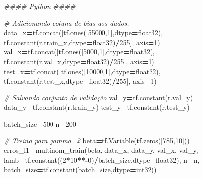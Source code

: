 \documentclass[
]{article}
\newenvironment{Shaded}{\begin{snugshade}}{\end{snugshade}}
\newcommand{\CommentTok}[1]{\textcolor[rgb]{0.56,0.35,0.01}{\textit{#1}}}
\newcommand{\DecValTok}[1]{\textcolor[rgb]{0.00,0.00,0.81}{#1}}
\newcommand{\NormalTok}[1]{#1}
\newcommand{\OperatorTok}[1]{\textcolor[rgb]{0.81,0.36,0.00}{\textbf{#1}}}
\newcommand{\StringTok}[1]{\textcolor[rgb]{0.31,0.60,0.02}{#1}}
\begin{document}
\begin{Shaded}
\begin{Highlighting}[]
\CommentTok{\#\#\#\# Python \#\#\#\#}

\CommentTok{\# Adicionando coluna de bias aos dados.}
\NormalTok{data\_x}\OperatorTok{=}\NormalTok{tf.concat([tf.ones([}\DecValTok{55000}\NormalTok{,}\DecValTok{1}\NormalTok{],dtype}\OperatorTok{=}\StringTok{\textquotesingle{}float32\textquotesingle{}}\NormalTok{),}
\NormalTok{                  tf.constant(r.train\_x,dtype}\OperatorTok{=}\StringTok{\textquotesingle{}float32\textquotesingle{}}\NormalTok{)}\OperatorTok{/}\DecValTok{255}\NormalTok{],}
\NormalTok{                axis}\OperatorTok{=}\DecValTok{1}\NormalTok{)}
\NormalTok{val\_x}\OperatorTok{=}\NormalTok{tf.concat([tf.ones([}\DecValTok{5000}\NormalTok{,}\DecValTok{1}\NormalTok{],dtype}\OperatorTok{=}\StringTok{\textquotesingle{}float32\textquotesingle{}}\NormalTok{),}
\NormalTok{                 tf.constant(r.val\_x,dtype}\OperatorTok{=}\StringTok{\textquotesingle{}float32\textquotesingle{}}\NormalTok{)}\OperatorTok{/}\DecValTok{255}\NormalTok{],}
\NormalTok{                axis}\OperatorTok{=}\DecValTok{1}\NormalTok{)}
\NormalTok{test\_x}\OperatorTok{=}\NormalTok{tf.concat([tf.ones([}\DecValTok{10000}\NormalTok{,}\DecValTok{1}\NormalTok{],dtype}\OperatorTok{=}\StringTok{\textquotesingle{}float32\textquotesingle{}}\NormalTok{),}
\NormalTok{                  tf.constant(r.test\_x,dtype}\OperatorTok{=}\StringTok{\textquotesingle{}float32\textquotesingle{}}\NormalTok{)}\OperatorTok{/}\DecValTok{255}\NormalTok{],}
\NormalTok{                axis}\OperatorTok{=}\DecValTok{1}\NormalTok{)}
              
\CommentTok{\# Salvando conjunto de validação}
\NormalTok{val\_y}\OperatorTok{=}\NormalTok{tf.constant(r.val\_y)}
\NormalTok{data\_y}\OperatorTok{=}\NormalTok{tf.constant(r.train\_y)}
\NormalTok{test\_y}\OperatorTok{=}\NormalTok{tf.constant(r.test\_y)}

\NormalTok{batch\_size}\OperatorTok{=}\DecValTok{500}
\NormalTok{n}\OperatorTok{=}\DecValTok{200}

\CommentTok{\# Treino para gamma=2}
\NormalTok{beta}\OperatorTok{=}\NormalTok{tf.Variable(tf.zeros([}\DecValTok{785}\NormalTok{,}\DecValTok{10}\NormalTok{]))}
\NormalTok{erros\_l1}\OperatorTok{=}\NormalTok{multinom\_train(beta,}
\NormalTok{                     data\_x,}
\NormalTok{                     data\_y,}
\NormalTok{                     val\_x,}
\NormalTok{                     val\_y,}
\NormalTok{                     lamb}\OperatorTok{=}\NormalTok{tf.constant((}\DecValTok{2}\OperatorTok{*}\DecValTok{10}\OperatorTok{**{-}}\DecValTok{0}\NormalTok{)}\OperatorTok{/}\NormalTok{batch\_size,dtype}\OperatorTok{=}\StringTok{\textquotesingle{}float32\textquotesingle{}}\NormalTok{),}
\NormalTok{                     n}\OperatorTok{=}\NormalTok{n,}
\NormalTok{                     batch\_size}\OperatorTok{=}\NormalTok{tf.constant(batch\_size,dtype}\OperatorTok{=}\StringTok{\textquotesingle{}int32\textquotesingle{}}\NormalTok{))}
                     

\end{Highlighting}
\end{Shaded}
\end{document}
